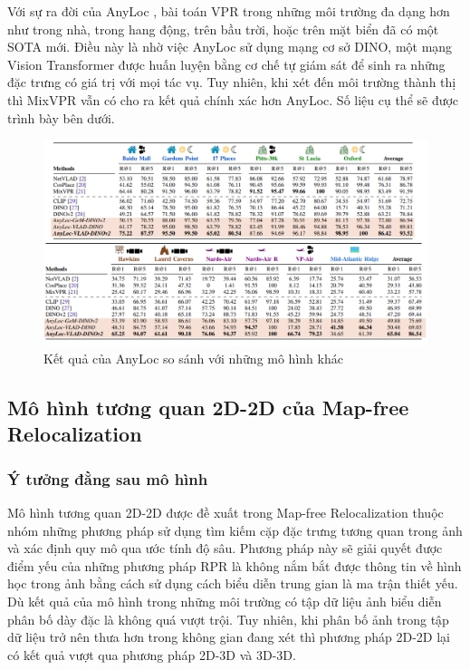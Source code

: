 Với sự ra đời của AnyLoc \cite{keetha2023anyloc}, bài toán VPR trong những môi trường đa dạng hơn như trong nhà, trong hang động, trên bầu trời, hoặc trên mặt biển đã có một SOTA mới. Điều này là nhờ việc AnyLoc sử dụng mạng cơ sở DINO, một mạng Vision Transformer được huấn luyện bằng cơ chế tự giám sát để sinh ra những đặc trưng có giá trị với mọi tác vụ. Tuy nhiên, khi xét đến môi trường thành thị thì MixVPR vẫn có cho ra kết quả chính xác hơn AnyLoc. Số liệu cụ thể sẽ được trình bày bên dưới.

\begin{figure}[H]
    \centering
    \includegraphics[scale=0.5]{pics/Proposal/anyloc.png}
    \caption{Kết quả của AnyLoc so sánh với những mô hình khác \cite{keetha2023anyloc}}
\end{figure}



\subsection{Mô hình tương quan 2D-2D của Map-free Relocalization \cite{arnold2022mapfree}}
\subsubsection*{Ý tưởng đằng sau mô hình}
Mô hình tương quan 2D-2D được đề xuất trong Map-free Relocalization thuộc nhóm những phương pháp sử dụng tìm kiếm cặp đặc trưng tương quan trong ảnh và xác định quy mô qua ước tính độ sâu. Phương pháp này sẽ giải quyết được điểm yếu của những phương pháp RPR là không nắm bắt được thông tin về hình học trong ảnh bằng cách sử dụng cách biểu diễn trung gian là ma trận thiết yếu. Dù kết quả của mô hình trong những môi trường có tập dữ liệu ảnh biểu diễn phân bố dày đặc là không quá vượt trội. Tuy nhiên, khi phân bố ảnh trong tập dữ liệu trở nên thưa hơn trong không gian đang xét thì phương pháp 2D-2D lại có kết quả vượt qua phương pháp 2D-3D và 3D-3D. 
